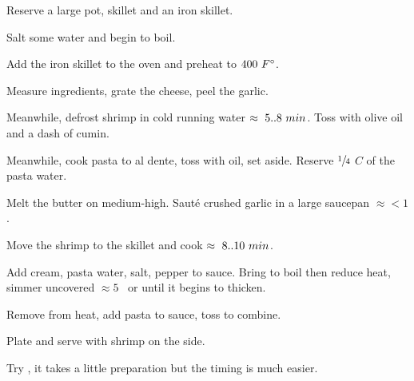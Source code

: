 \begin{preparation}
\item Reserve a large pot, skillet and an iron skillet.

\item Salt some water and begin to boil.

\item Add the iron skillet to the oven and preheat to $400~\Fahrenheit$.

\item Measure ingredients, grate the cheese, peel the garlic.

\item Meanwhile, defrost shrimp in cold running water $\approx~5..8~\minute$.
	Toss with olive oil and a dash of cumin.

\item Meanwhile, cook pasta to al dente, toss with oil, set aside.
	Reserve $\onefourth$ $C$ of the pasta water.

\item Melt the butter on medium-high.
	Saut\'{e} crushed garlic in a large saucepan $\approx<1$ \minute.

\item Move the shrimp to the skillet and cook $\approx~8..10~\minute$.

\item Add cream, pasta water, salt, pepper to sauce.
	Bring to boil then reduce heat, simmer uncovered $\approx5$ \minute~or until it begins to thicken.

\item Remove from heat, add pasta to sauce, toss to combine.

\item Plate and serve with shrimp on the side.
\end{preparation}

\begin{variation}
\item Try , it takes a little preparation but the timing is much easier.

\end{variation}

\recipeend%

